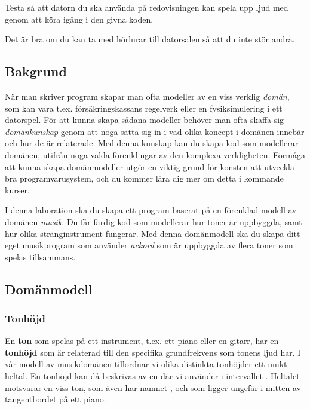 


\begin{Preparations}
\item Testa så att datorn du ska använda på redovisningen kan spela upp ljud med  genom att köra igång  i den givna koden.
\item Det är bra om du kan ta med hörlurar till datorsalen så att du inte stör andra.
\end{Preparations}

\subsection{Bakgrund}
När man skriver program skapar man ofta modeller av en viss verklig \emph{domän}, som kan vara t.ex. försäkringskassans regelverk eller en fysiksimulering i ett datorspel. För att kunna skapa sådana modeller behöver man ofta skaffa sig  \emph{domänkunskap} genom att noga sätta sig in i vad olika koncept i domänen innebär och hur de är relaterade. Med denna kunskap kan du skapa kod som modellerar domänen, utifrån noga valda förenklingar av den komplexa verkligheten. Förmåga att kunna skapa domänmodeller utgör en viktig grund för konsten att utveckla bra programvarusystem, och du kommer lära dig mer om detta i kommande kurser.

I denna laboration ska du skapa ett program baserat på en förenklad modell av domänen \emph{musik}. Du får färdig kod som modellerar hur toner är uppbyggda, samt hur olika stränginstrument fungerar.
Med denna domänmodell ska du skapa ditt eget musikprogram som använder \emph{ackord} som är uppbyggda av flera toner som spelas tillsammans.

\subsection{Domänmodell}


\subsubsection{Tonhöjd}

En \textbf{ton}  som spelas på ett instrument, t.ex. ett piano eller en gitarr, har en \textbf{tonhöjd}  som är relaterad till den specifika  grundfrekvens som tonens ljud har. I vår modell av musikdomänen tillordnar vi olika distinkta tonhöjder ett unikt heltal. En tonhöjd kan då beskrivas av en  där vi använder  i intervallet . Heltalet  motsvarar en viss ton, som även har namnet  , och som ligger ungefär i mitten av tangentbordet på ett piano.

